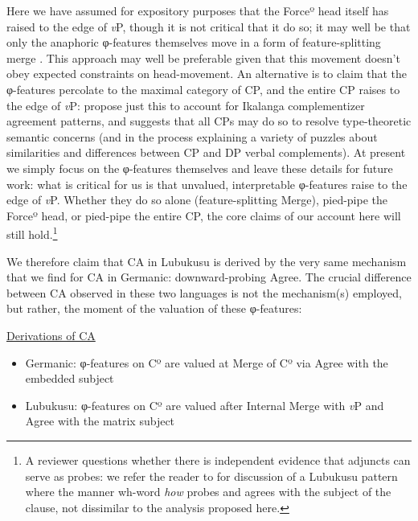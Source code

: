 \noindent Here we have assumed for expository purposes that the Forceº head itself has raised to the edge of \textit{v}P, though it is not critical that it do so; it may well be that only the anaphoric φ-features themselves move in a form of feature-splitting merge \citep{Obata:2011}. This approach may well be preferable given that this movement doesn't obey expected constraints on head-movement. An alternative is to claim that the φ-features percolate to the maximal category of CP, and the entire CP raises to the edge of \textit{v}P: \citet{LetsholoSafir:2017} propose just this to account for Ikalanga complementizer agreement patterns, and \citet{Moulton:2015} suggests that all CPs may do so to resolve type-theoretic semantic concerns (and in the process explaining a variety of puzzles about similarities and differences between CP and DP verbal complements). At present we simply focus on the φ-features themselves and leave these details for future work: what is critical for us is that unvalued, interpretable φ-features raise to the edge of \textit{v}P. Whether they do so alone (feature-splitting Merge), pied-pipe the Forceº head, or pied-pipe the entire CP, the core claims of our account here will still hold.\footnote{A reviewer questions whether there is independent evidence that adjuncts can serve as probes: we refer the reader to \citet{CarstensDiercks:2013} for discussion of a Lubukusu pattern where the manner wh-word \textit{how} probes and agrees with the subject of the clause, not dissimilar to the analysis proposed here.} 

We therefore claim that CA in Lubukusu is derived by the very same mechanism that we find for CA in Germanic: downward-probing Agree. The crucial difference between CA observed in these two languages is not the mechanism(s) employed, but rather, the moment of the valuation of these φ-features:

\newpage 
\ea \underline{Derivations of CA}
\begin{itemize}
\item Germanic: φ-features on Cº are valued at Merge of Cº via Agree with the embedded subject
\item Lubukusu: φ-features on Cº are valued after Internal Merge with \textit{v}P and Agree with the matrix subject
\end{itemize}
\z

